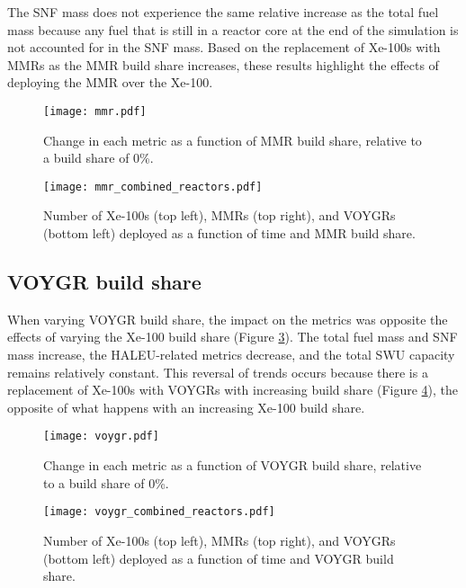 The \gls{SNF} mass does not experience the same 
relative increase as the total fuel mass because any fuel that is still in a 
reactor core at the end of the simulation is not accounted for in the 
\gls{SNF} mass. 
Based on the replacement of Xe-100s with \glspl{MMR} as the \gls{MMR} 
build share increases, these results highlight the effects of deploying the
\gls{MMR} over the Xe-100. 

\begin{figure}
    \centering
    \texttt{[image: mmr.pdf]}
    \caption{Change in each metric as a function of MMR build share, 
    relative to a build share of 0\%.}
    \label{fig:mmr_scenario7}
\end{figure}


\begin{figure}
    \centering
    \texttt{[image: mmr\_combined\_reactors.pdf]}
    \caption{Number of Xe-100s (top left), MMRs (top right), and 
    VOYGRs (bottom left) deployed as a function of time and 
    MMR build share.}
    \label{fig:mmr_reactors_s7}
\end{figure}


\subsection{VOYGR build share}
When varying VOYGR build share, the impact on the metrics was 
opposite the effects of varying the Xe-100 build share (Figure 
\ref{fig:voygr_scenario7}). The total fuel mass and \gls{SNF} mass 
increase, the \gls{HALEU}-related metrics decrease, and the total 
\gls{SWU} capacity remains relatively constant. This reversal 
of trends occurs because there is a replacement of Xe-100s with VOYGRs
with increasing build share (Figure \ref{fig:voygr_reactors_s7}), 
the opposite of what happens with an increasing Xe-100 build share. 

\begin{figure}
    \centering
    \texttt{[image: voygr.pdf]}
    \caption{Change in each metric as a function of VOYGR build share, 
    relative to a build share of 0\%.}
    \label{fig:voygr_scenario7}
\end{figure}

\begin{figure}
    \centering
    \texttt{[image: voygr\_combined\_reactors.pdf]}
    \caption{Number of Xe-100s (top left), MMRs (top right), and 
    VOYGRs (bottom left) deployed as a function of time and 
    VOYGR build share.}
    \label{fig:voygr_reactors_s7}
\end{figure}

